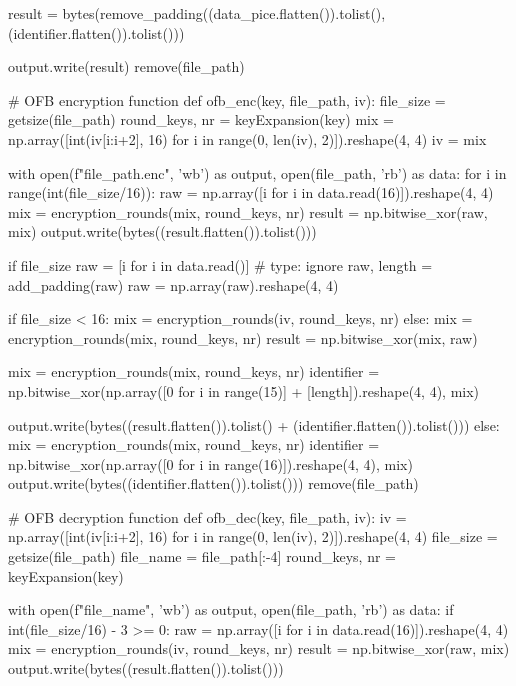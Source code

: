 \begin{python}
        result = bytes(remove_padding((data_pice.flatten()).tolist(), (identifier.flatten()).tolist()))

        output.write(result)
    remove(file_path)


# OFB encryption function
def ofb_enc(key, file_path, iv):
    file_size = getsize(file_path)
    round_keys, nr = keyExpansion(key)
    mix = np.array([int(iv[i:i+2], 16) for i in range(0, len(iv), 2)]).reshape(4, 4)
    iv = mix

    with open(f"{file_path}.enc", 'wb') as output, open(file_path, 'rb') as data:
        for i in range(int(file_size/16)):
            raw = np.array([i for i in data.read(16)]).reshape(4, 4)
            mix = encryption_rounds(mix, round_keys, nr)
            result = np.bitwise_xor(raw, mix)
            output.write(bytes((result.flatten()).tolist()))

        if file_size %
            raw = [i for i in data.read()]  # type: ignore
            raw, length = add_padding(raw)
            raw = np.array(raw).reshape(4, 4)

            if file_size < 16:
                mix = encryption_rounds(iv, round_keys, nr)
            else:
                mix = encryption_rounds(mix, round_keys, nr)
            result = np.bitwise_xor(mix, raw)

            mix = encryption_rounds(mix, round_keys, nr)
            identifier = np.bitwise_xor(np.array([0 for i in range(15)] + [length]).reshape(4, 4), mix)

            output.write(bytes((result.flatten()).tolist() + (identifier.flatten()).tolist()))
        else:
            mix = encryption_rounds(mix, round_keys, nr)
            identifier = np.bitwise_xor(np.array([0 for i in range(16)]).reshape(4, 4), mix)
            output.write(bytes((identifier.flatten()).tolist()))
    remove(file_path)


# OFB decryption function
def ofb_dec(key, file_path, iv):
    iv = np.array([int(iv[i:i+2], 16) for i in range(0, len(iv), 2)]).reshape(4, 4)
    file_size = getsize(file_path)
    file_name = file_path[:-4]
    round_keys, nr = keyExpansion(key)

    with open(f"{file_name}", 'wb') as output, open(file_path, 'rb') as data:
        if int(file_size/16) - 3 >= 0:
            raw = np.array([i for i in data.read(16)]).reshape(4, 4)
            mix = encryption_rounds(iv, round_keys, nr)
            result = np.bitwise_xor(raw, mix)
            output.write(bytes((result.flatten()).tolist()))


\end{python}
